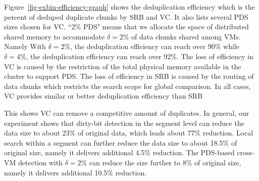 Figure~\ref{fig-exbin-efficiency-graph} shows the deduplication efficiency which is
the percent of deduped duplicate chunks by SRB and VC.
It also lists several PDS sizes chosen for VC. ``2\% PDS" means that
we allocate the space of distributed shared memory  to accommodate $\delta=2\%$
of data chunks shared among VMs. Namely 
With $\delta=2\%$, the deduplication efficiency can reach over 90\% 
while $\delta=4\%$, the deduplication efficiency can reach over 92\%. 
The loss of efficiency in VC is caused by the restriction of the total physical memory available
in the cluster to support PDS.  
The loss of efficiency in SRB is caused by the routing of data chunks which restricts the search scope
for global comparison.
In all cases, VC provides similar or better deduplication efficiency than SRB

This shows VC can remove  a competitive amount of duplicates.
In general, our experiment shows that
dirty-bit detection in the segment level  can reduce the data size to about 23\% of original data, 
which leads  about 77\% reduction.
Local search within a segment can   further reduce the data size
to about 18.5\% of original size, namely it delivers additional 4.5\% reduction.
The PDS-based cross-VM detection with $\delta=2\% $
can reduce the  size further to 8\% of original size, namely it 
delivers additional 10.5\% reduction.


